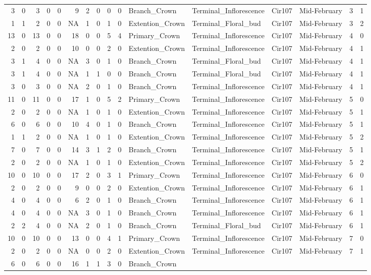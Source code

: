 \documentclass[]{article}
\begin{document}
\begin{longtable}[]{@{}rrrrrrrrrrllllrl@{}}
3 & 0 & 3 & 0 & 0 & 9 & 2 & 0 & 0 & 0 & Branch\_Crown &
Terminal\_Inflorescence & Cir107 & Mid-February & 3 & 1\tabularnewline
1 & 1 & 2 & 0 & 0 & NA & 1 & 0 & 1 & 0 & Extention\_Crown &
Terminal\_Floral\_bud & Cir107 & Mid-February & 3 & 2\tabularnewline
13 & 0 & 13 & 0 & 0 & 18 & 0 & 0 & 5 & 4 & Primary\_Crown &
Terminal\_Inflorescence & Cir107 & Mid-February & 4 & 0\tabularnewline
2 & 0 & 2 & 0 & 0 & 10 & 0 & 0 & 2 & 0 & Extention\_Crown &
Terminal\_Inflorescence & Cir107 & Mid-February & 4 & 1\tabularnewline
3 & 1 & 4 & 0 & 0 & NA & 3 & 0 & 1 & 0 & Branch\_Crown &
Terminal\_Floral\_bud & Cir107 & Mid-February & 4 & 1\tabularnewline
3 & 1 & 4 & 0 & 0 & NA & 1 & 1 & 0 & 0 & Branch\_Crown &
Terminal\_Floral\_bud & Cir107 & Mid-February & 4 & 1\tabularnewline
3 & 0 & 3 & 0 & 0 & NA & 2 & 0 & 1 & 0 & Branch\_Crown &
Terminal\_Inflorescence & Cir107 & Mid-February & 4 & 1\tabularnewline
11 & 0 & 11 & 0 & 0 & 17 & 1 & 0 & 5 & 2 & Primary\_Crown &
Terminal\_Inflorescence & Cir107 & Mid-February & 5 & 0\tabularnewline
2 & 0 & 2 & 0 & 0 & NA & 1 & 0 & 1 & 0 & Extention\_Crown &
Terminal\_Inflorescence & Cir107 & Mid-February & 5 & 1\tabularnewline
6 & 0 & 6 & 0 & 0 & 10 & 4 & 0 & 1 & 0 & Branch\_Crown &
Terminal\_Inflorescence & Cir107 & Mid-February & 5 & 1\tabularnewline
1 & 1 & 2 & 0 & 0 & NA & 1 & 0 & 1 & 0 & Extention\_Crown &
Terminal\_Inflorescence & Cir107 & Mid-February & 5 & 2\tabularnewline
7 & 0 & 7 & 0 & 0 & 14 & 3 & 1 & 2 & 0 & Branch\_Crown &
Terminal\_Inflorescence & Cir107 & Mid-February & 5 & 1\tabularnewline
2 & 0 & 2 & 0 & 0 & NA & 1 & 0 & 1 & 0 & Extention\_Crown &
Terminal\_Inflorescence & Cir107 & Mid-February & 5 & 2\tabularnewline
10 & 0 & 10 & 0 & 0 & 17 & 2 & 0 & 3 & 1 & Primary\_Crown &
Terminal\_Inflorescence & Cir107 & Mid-February & 6 & 0\tabularnewline
2 & 0 & 2 & 0 & 0 & 9 & 0 & 0 & 2 & 0 & Extention\_Crown &
Terminal\_Inflorescence & Cir107 & Mid-February & 6 & 1\tabularnewline
4 & 0 & 4 & 0 & 0 & 6 & 2 & 0 & 1 & 0 & Branch\_Crown &
Terminal\_Inflorescence & Cir107 & Mid-February & 6 & 1\tabularnewline
4 & 0 & 4 & 0 & 0 & NA & 3 & 0 & 1 & 0 & Branch\_Crown &
Terminal\_Inflorescence & Cir107 & Mid-February & 6 & 1\tabularnewline
2 & 2 & 4 & 0 & 0 & NA & 2 & 0 & 1 & 0 & Branch\_Crown &
Terminal\_Floral\_bud & Cir107 & Mid-February & 6 & 1\tabularnewline
10 & 0 & 10 & 0 & 0 & 13 & 0 & 0 & 4 & 1 & Primary\_Crown &
Terminal\_Inflorescence & Cir107 & Mid-February & 7 & 0\tabularnewline
2 & 0 & 2 & 0 & 0 & NA & 0 & 0 & 2 & 0 & Extention\_Crown &
Terminal\_Inflorescence & Cir107 & Mid-February & 7 & 1\tabularnewline
6 & 0 & 6 & 0 & 0 & 16 & 1 & 1 & 3 & 0 & Branch\_Crown &

\end{longtable}
\end{document}
